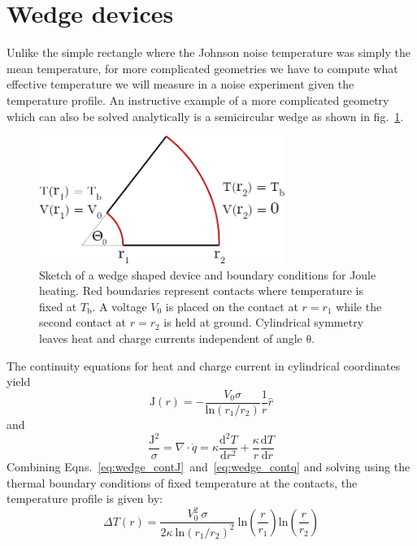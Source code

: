 \section{Wedge devices}
Unlike the simple rectangle where the Johnson noise temperature was simply  the mean temperature, for more complicated geometries we have to compute what effective temperature we will measure in a noise experiment given the temperature profile. An instructive example of a more complicated geometry which can also be solved analytically is a semicircular wedge as shown in fig.~\ref{fig:KCwedge}.
\begin{figure}
\centering
\includegraphics[width=80mm]{figures/thermal_via_noise/wedge.png}
\caption{Sketch of a wedge shaped device and boundary conditions for Joule heating. Red boundaries represent contacts where temperature is fixed at $T_\mathrm{b}$. A voltage $V_0$ is placed on the contact at $r=r_1$ while the second contact at $r=r_2$ is held at ground. Cylindrical symmetry leaves heat and charge currents independent of angle $\mathrm{\theta}$.}
\label{fig:KCwedge}
\end{figure}
The continuity equations for heat and charge current in cylindrical coordinates yield
\begin{equation}\label{eq:wedge_contJ}
\mathrm{J}(r) = -\frac{V_0\sigma}{\mathrm{ln}(r_1/r_2)}\frac{1}{r}\hat{r}
\end{equation}
and
\begin{equation}\label{eq:wedge_contq}
\frac{\mathrm{J}^2}{\sigma} = \nabla\cdot\dot{q} = \kappa\frac{\mathrm{d}^2 T}{\mathrm{d}r^2}+\frac{\kappa}{r}\frac{\mathrm{d} T}{\mathrm{d}r}
\end{equation}
Combining Eqns.~\ref{eq:wedge_contJ}~and~\ref{eq:wedge_contq} and solving using the thermal boundary conditions of fixed temperature at the contacts, the temperature profile is given by:
\begin{equation}\label{eq:wedge_Tprofile}
\Delta T(r) = \frac{V_0^2~\sigma}{2\kappa~\mathrm{ln}\left(r_1/r_2\right)^2}~\mathrm{ln}\left(\frac{r}{r_1}\right)\mathrm{ln}\left(\frac{r}{r_2}\right)
\end{equation}
